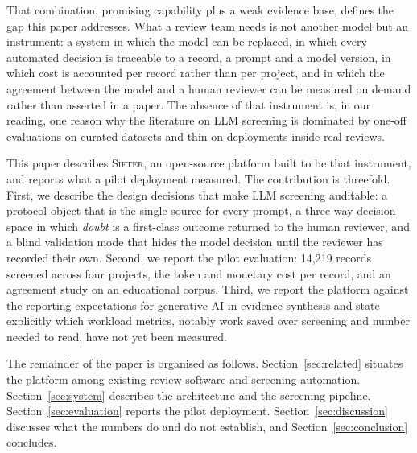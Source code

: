 That combination, promising capability plus a weak evidence base, defines the
gap this paper addresses. What a review team needs is not another model but an
instrument: a system in which the model can be replaced, in which every
automated decision is traceable to a record, a prompt and a model version, in
which cost is accounted per record rather than per project, and in which the
agreement between the model and a human reviewer can be measured on demand
rather than asserted in a paper. The absence of that instrument is, in our
reading, one reason why the literature on LLM screening is dominated by
one-off evaluations on curated datasets and thin on deployments inside real
reviews.

This paper describes \textsc{Sifter}, an open-source platform built to be that
instrument, and reports what a pilot deployment measured. The contribution is
threefold. First, we describe the design decisions that make LLM screening
auditable: a protocol object that is the single source for every prompt, a
three-way decision space in which \emph{doubt} is a first-class outcome
returned to the human reviewer, and a blind validation mode that hides the
model decision until the reviewer has recorded their own. Second, we report
the pilot evaluation: 14{,}219 records screened across four projects, the token
and monetary cost per record, and an agreement study on an educational corpus.
Third, we report the platform against the reporting expectations for
generative AI in evidence synthesis \autocite{Farotimi_2025} and state
explicitly which workload metrics, notably work saved over screening and
number needed to read, have not yet been measured.

The remainder of the paper is organised as follows.
Section~\ref{sec:related} situates the platform among existing review software
and screening automation. Section~\ref{sec:system} describes the architecture
and the screening pipeline. Section~\ref{sec:evaluation} reports the pilot
deployment. Section~\ref{sec:discussion} discusses what the numbers do and do
not establish, and Section~\ref{sec:conclusion} concludes.
